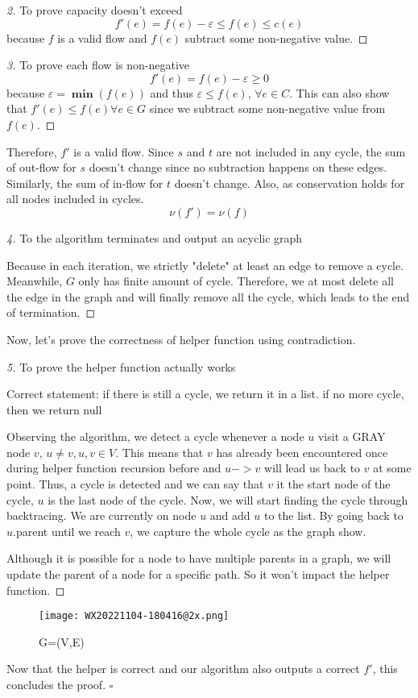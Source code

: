 \documentclass[openany]{article}
\begin{document}
\begin{proof}[2]{To prove capacity doesn't exceed}
    \[f'(e) = f(e) - \varepsilon \leq f(e) \leq c(e)\] because $f$ is a valid flow and $f(e)$ subtract some non-negative value.
    
\end{proof}

\begin{proof}[3]{To prove each flow is non-negative}
    \[f'(e) = f(e) - \varepsilon \geq 0\] because $\varepsilon = \mathbf{\min}(f(e))$ and thus $\varepsilon \leq f(e)$, $\forall e \in C$. This can also show that $f'(e)\leq f(e) \forall e \in G$ since we subtract some non-negative value from $f(e)$.
    
\end{proof}

Therefore, $f'$ is a valid flow. Since $s$ and $t$ are not included in any cycle, the sum of out-flow for $s$ doesn't change since no subtraction happens on these edges. Similarly, the sum of in-flow for $t$ doesn't change. Also, as conservation holds for all nodes included in cycles.
\[\nu(f') = \nu(f)\]

\begin{proof}[4]{To the algorithm terminates and output an acyclic graph}

Because in each iteration, we strictly "delete" at least an edge to remove a cycle. Meanwhile, $G$ only has finite amount of cycle. Therefore, we at most delete all the edge in the graph and will finally remove all the cycle, which leads to the end of termination.


\end{proof}

Now, let's prove the correctness of helper function using contradiction.
\begin{proof}[5]{To prove the helper function actually works}

Correct statement: if there is still a cycle, we return it in a list. if no more cycle, then we return null

Observing the algorithm, we detect a cycle whenever a node $u$ visit a GRAY node $v$, $u\neq v, u,v \in V$. This means that $v$ has already been encountered once during helper function recursion before and $u->v$ will lead us back to $v$ at some point. Thus, a cycle is detected and we can say that $v$ it the start node of the cycle, $u$ is the last node of the cycle. Now, we will start finding the cycle through backtracing. We are currently on node $u$ and add $u$ to the list. By going back to $u$.parent until we reach $v$, we capture the whole cycle as the graph show.

Although it is possible for a node to have multiple parents in a graph, we will update the parent of a node for a specific path. So it won't impact the helper function.

\end{proof}
\begin{figure}[htp]
    \centering
    \texttt{[image: WX20221104-180416@2x.png]}
    \caption{G=(V,E)}
    \label{fig:galaxy}
\end{figure}
Now that the helper is correct and our algorithm also outputs a correct $f'$, this concludes the proof. $\square$
\end{document}
